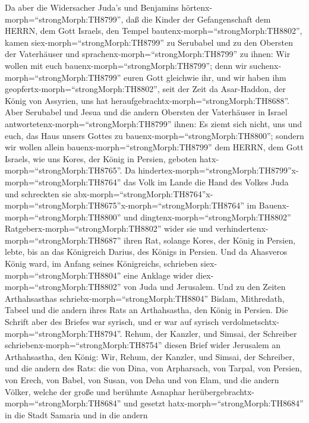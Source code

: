  Da aber die Widersacher Juda's und Benjamins
hörtenx-morph=``strongMorph:TH8799'', daß die Kinder der Gefangenschaft
dem HERRN, dem Gott Israels, den Tempel
bautenx-morph=``strongMorph:TH8802'',  kamen
siex-morph=``strongMorph:TH8799'' zu Serubabel und zu den Obersten der
Vaterhäuser und sprachenx-morph=``strongMorph:TH8799'' zu ihnen: Wir
wollen mit euch bauenx-morph=``strongMorph:TH8799''; denn wir
suchenx-morph=``strongMorph:TH8799'' euren Gott gleichwie ihr, und wir
haben ihm geopfertx-morph=``strongMorph:TH8802'', seit der Zeit da
Asar-Haddon, der König von Assyrien, uns hat
heraufgebrachtx-morph=``strongMorph:TH8688''.  Aber
Serubabel und Jesua und die andern Obersten der Vaterhäuser in Israel
antwortetenx-morph=``strongMorph:TH8799'' ihnen: Es ziemt sich nicht,
uns und euch, das Haus unsers Gottes zu
bauenx-morph=``strongMorph:TH8800''; sondern wir wollen allein
bauenx-morph=``strongMorph:TH8799'' dem HERRN, dem Gott Israels, wie uns
Kores, der König in Persien, geboten hatx-morph=``strongMorph:TH8765''.
 Da
hindertex-morph=``strongMorph:TH8799''x-morph=``strongMorph:TH8764'' das
Volk im Lande die Hand des Volkes Juda und schreckten sie
abx-morph=``strongMorph:TH8764''\textbar x-morph=``strongMorph:TH8675''x-morph=``strongMorph:TH8764''
im Bauenx-morph=``strongMorph:TH8800''  und
dingtenx-morph=``strongMorph:TH8802''
Ratgeberx-morph=``strongMorph:TH8802'' wider sie und
verhindertenx-morph=``strongMorph:TH8687'' ihren Rat, solange Kores, der
König in Persien, lebte, bis an das Königreich Darius, des Königs in
Persien.  Und da Ahasveros König ward, im Anfang seines
Königreichs, schrieben siex-morph=``strongMorph:TH8804'' eine Anklage
wider diex-morph=``strongMorph:TH8802'' von Juda und Jerusalem.
 Und zu den Zeiten Arthahsasthas
schriebx-morph=``strongMorph:TH8804'' Bislam, Mithredath, Tabeel und die
andern ihres Rats an Arthahsastha, den König in Persien. Die Schrift
aber des Briefes war syrisch, und er war auf syrisch
verdolmetschtx-morph=``strongMorph:TH8794''.  Rehum, der
Kanzler, und Simsai, der Schreiber
schriebenx-morph=``strongMorph:TH8754'' diesen Brief wider Jerusalem an
Arthahsastha, den König:  Wir, Rehum, der Kanzler, und
Simsai, der Schreiber, und die andern des Rats: die von Dina, von
Arpharsach, von Tarpal, von Persien, von Erech, von Babel, von Susan,
von Deha und von Elam,  und die andern Völker, welche der
große und berühmte Asnaphar
herübergebrachtx-morph=``strongMorph:TH8684'' und gesetzt
hatx-morph=``strongMorph:TH8684'' in die Stadt Samaria und in die andern
